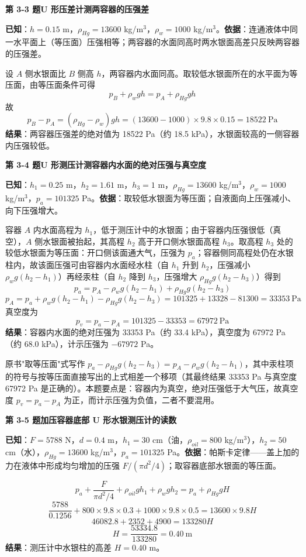 \noindent\textbf{第 3-3 题\quad U 形压差计测两容器的压强差}

\begin{jie}
\textbf{已知}：$h=0.15$ m，$\rho_{Hg}=13600$ kg/m$^3$，$\rho_w=1000$ kg/m$^3$。\textbf{依据}：连通液体中同一水平面上（等压面）压强相等；两容器的水面同高时两水银面高差只反映两容器的压强差。

设 $A$ 侧水银面比 $B$ 侧高 $h$，两容器内水面同高。取较低水银面所在的水平面为等压面，由等压面条件可得
\[ p_B+\rho_w gh=p_A+\rho_{Hg}gh \]
故
\[ p_B-p_A=(\rho_{Hg}-\rho_w)gh=(13600-1000)\times9.8\times0.15=18522\ \mathrm{Pa} \]
\textbf{结果}：两容器压强差的绝对值为 18522 Pa（约 18.5 kPa），水银面较高的一侧容器内压强较低。
\end{jie}

\noindent\textbf{第 3-4 题\quad U 形测压计测容器内水面的绝对压强与真空度}

\begin{jie}
\textbf{已知}：$h_1=0.25$ m，$h_2=1.61$ m，$h_3=1$ m，$\rho_{Hg}=13600$ kg/m$^3$，$\rho_w=1000$ kg/m$^3$，$p_a=101325$ Pa。\textbf{依据}：取较低水银面为等压面；自液面向上压强减小、向下压强增大。

容器 $A$ 内水面高程为 $h_1$，低于测压计中的水银面；由于容器内压强很低（真空），$A$ 侧水银面被抬起，其高程 $h_2$ 高于开口侧水银面高程 $h_3$。取高程 $h_3$ 处的较低水银面为等压面：开口侧该面通大气，压强为 $p_a$；容器侧同高程处仍在水银柱内，故该面压强可由容器内水面经水柱（自 $h_1$ 升到 $h_2$，压强减小 $\rho_w g(h_2-h_1)$）再经汞柱（自 $h_2$ 降到 $h_3$，压强增大 $\rho_{Hg}g(h_2-h_3)$）得到
\[ p_a=p_A-\rho_w g(h_2-h_1)+\rho_{Hg}g(h_2-h_3) \]
\[ p_A=p_a+\rho_w g(h_2-h_1)-\rho_{Hg}g(h_2-h_3)=101325+13328-81300=33353\ \mathrm{Pa} \]
真空度为
\[ p_v=p_a-p_A=101325-33353=67972\ \mathrm{Pa} \]
\textbf{结果}：容器内水面的绝对压强为 33353 Pa（约 33.4 kPa），真空度为 67972 Pa（约 68.0 kPa），计示压强为 $-67972$ Pa。
\end{jie}

\begin{yicuo}
原书"取等压面"式写作 $p_a-\rho_{Hg}g(h_2-h_3)=p_A-\rho_w g(h_2-h_1)$，其中汞柱项的符号与按等压面直接写出的上式相差一个移项（其最终结果 33353 Pa 与真空度 67972 Pa 是正确的）。本题要点是：容器内为真空，绝对压强低于大气压，故真空度 $p_v=p_a-p_A$ 为正，而计示压强为负值，二者不要混用。
\end{yicuo}

\noindent\textbf{第 3-5 题\quad 加压容器底部 U 形水银测压计的读数}

\begin{jie}
\textbf{已知}：$F=5788$ N，$d=0.4$ m，$h_1=30$ cm（油，$\rho_{oil}=800$ kg/m$^3$），$h_2=50$ cm（水），$\rho_{Hg}=13600$ kg/m$^3$，$p_a=101325$ Pa。\textbf{依据}：帕斯卡定律——盖上加的力在液体中形成均匀增加的压强 $F/(\pi d^2/4)$；取容器底部水银面的等压面。

\[ p_a+\frac{F}{\pi d^2/4}+\rho_{oil}gh_1+\rho_w gh_2=p_a+\rho_{Hg}gH \]
\[ \frac{5788}{0.1256}+800\times9.8\times0.3+1000\times9.8\times0.5=13600\times9.8H \]
\[ 46082.8+2352+4900=133280H \]
\[ H=\frac{53334.8}{133280}=0.40\ \mathrm{m} \]
\textbf{结果}：测压计中水银柱的高差 $H=0.40$ m。
\end{jie}

